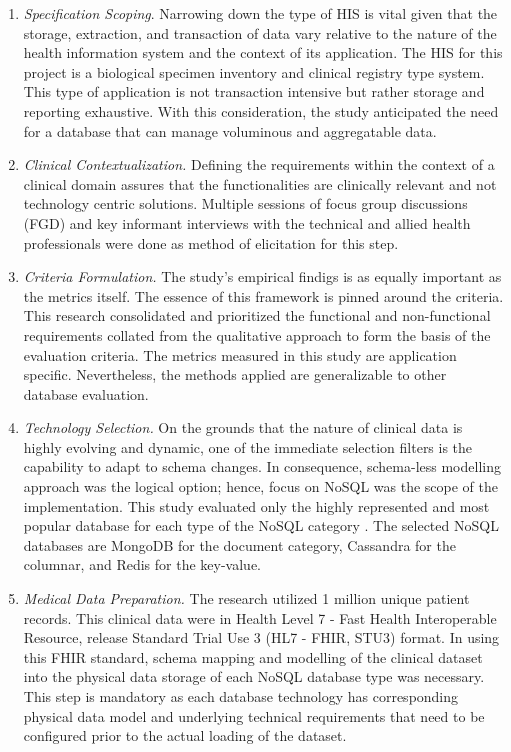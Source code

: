 \documentclass[5p]{elsarticle}
\begin{document}
\begin{enumerate}
\item \emph{Specification Scoping}. 
Narrowing down the type of HIS is vital given that the storage, extraction, and transaction of data vary relative to the nature of the health information system and the context of its application.
The HIS for this project is a biological specimen inventory and clinical registry type system. 
This type of application is not transaction intensive but rather storage and reporting exhaustive. 
With this consideration, the study anticipated the need for a database that can manage voluminous and aggregatable data.

\item \emph{Clinical Contextualization.} 
Defining the requirements within the context of a clinical domain assures that the functionalities are clinically relevant and not technology centric solutions.
Multiple sessions of focus group discussions (FGD) and key informant interviews with the technical and allied health professionals were done as method of elicitation for this step. 

\item \emph{Criteria Formulation.} 
The study's empirical findigs is as equally important as the metrics itself. The essence of this framework is pinned around the criteria.
This research consolidated and prioritized the functional and non-functional requirements collated from the qualitative approach to form the basis of the evaluation criteria.
The metrics measured in this study are application specific. Nevertheless, the methods applied are generalizable to other database evaluation.

\item \emph{Technology Selection.} 
On the grounds that the nature of clinical data is highly evolving and dynamic, one of the immediate selection filters is the capability to adapt to schema changes. In consequence, schema-less modelling approach was the logical option; hence, focus on NoSQL was the scope of the implementation. 
This study evaluated only the highly represented and most popular database for each type of the NoSQL category \cite{DBEnginesRanking2018}.
The selected NoSQL databases are MongoDB for the document category, Cassandra for the columnar, and Redis for the key-value.

\item \emph{Medical Data Preparation.} 
The research utilized 1 million unique patient records. 
This clinical data were in Health Level 7 - Fast Health Interoperable Resource, release Standard Trial Use 3 (HL7 - FHIR, STU3) format.
In using this FHIR standard, schema mapping and modelling of the clinical dataset into the physical data storage of each NoSQL database type was necessary.
This step is mandatory as each database technology has corresponding physical data model and underlying technical requirements that need to be configured prior to the actual loading of the dataset. 


\end{enumerate}
\end{document}
